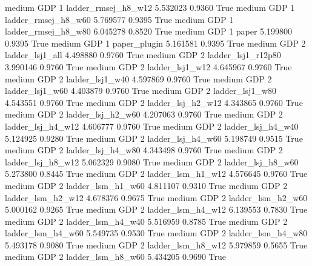     medium      GDP                 1    ladder_rmsej_h8_w12   5.532023      0.9360    True
    medium      GDP                 1    ladder_rmsej_h8_w60   5.769577      0.9395    True
    medium      GDP                 1    ladder_rmsej_h8_w80   6.045278      0.8520    True
    medium      GDP                 1                  paper   5.199800      0.9395    True
    medium      GDP                 1           paper_plugin   5.161581      0.9395    True
    medium      GDP                 2        ladder_lsj1_all   4.498880      0.9760    True
    medium      GDP                 2     ladder_lsj1_r12p80   3.990146      0.9760    True
    medium      GDP                 2        ladder_lsj1_w12   4.645967      0.9760    True
    medium      GDP                 2        ladder_lsj1_w40   4.597869      0.9760    True
    medium      GDP                 2        ladder_lsj1_w60   4.403879      0.9760    True
    medium      GDP                 2        ladder_lsj1_w80   4.543551      0.9760    True
    medium      GDP                 2      ladder_lsj_h2_w12   4.343865      0.9760    True
    medium      GDP                 2      ladder_lsj_h2_w60   4.207063      0.9760    True
    medium      GDP                 2      ladder_lsj_h4_w12   4.606777      0.9760    True
    medium      GDP                 2      ladder_lsj_h4_w40   5.124925      0.9280    True
    medium      GDP                 2      ladder_lsj_h4_w60   5.198749      0.9515    True
    medium      GDP                 2      ladder_lsj_h4_w80   4.343498      0.9760    True
    medium      GDP                 2      ladder_lsj_h8_w12   5.062329      0.9080    True
    medium      GDP                 2      ladder_lsj_h8_w60   5.273800      0.8445    True
    medium      GDP                 2      ladder_lsm_h1_w12   4.576645      0.9760    True
    medium      GDP                 2      ladder_lsm_h1_w60   4.811107      0.9310    True
    medium      GDP                 2      ladder_lsm_h2_w12   4.678376      0.9675    True
    medium      GDP                 2      ladder_lsm_h2_w60   5.000162      0.9265    True
    medium      GDP                 2      ladder_lsm_h4_w12   6.139553      0.7830    True
    medium      GDP                 2      ladder_lsm_h4_w40   5.516959      0.8785    True
    medium      GDP                 2      ladder_lsm_h4_w60   5.549735      0.9530    True
    medium      GDP                 2      ladder_lsm_h4_w80   5.493178      0.9080    True
    medium      GDP                 2      ladder_lsm_h8_w12   5.979859      0.5655    True
    medium      GDP                 2      ladder_lsm_h8_w60   5.434205      0.9690    True
